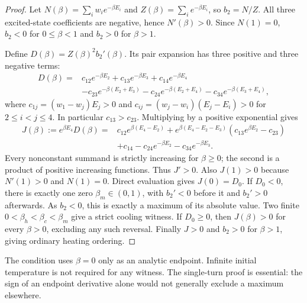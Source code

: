 \begin{proof}
Let $N(\beta)=\sum_iw_i e^{-\beta E_i}$ and $Z(\beta)=\sum_i e^{-\beta E_i}$, so $b_2=N/Z$. All three excited-state coefficients are negative, hence $N'(\beta)>0$. Since $N(1)=0$, $b_2<0$ for $0\leq\beta<1$ and $b_2>0$ for $\beta>1$.

Define $D(\beta)=Z(\beta)^2b_2'(\beta)$. Its pair expansion has three positive and three negative terms:
\begin{align*}
D(\beta)={}&c_{12}e^{-\beta E_2}+c_{13}e^{-\beta E_3}+c_{14}e^{-\beta E_4}\\
&-c_{23}e^{-\beta(E_2+E_3)}-c_{24}e^{-\beta(E_2+E_4)}-c_{34}e^{-\beta(E_3+E_4)},
\end{align*}
where $c_{1j}=(w_1-w_j)E_j>0$ and $c_{ij}=(w_j-w_i)(E_j-E_i)>0$ for $2\leq i<j\leq4$. In particular $c_{13}>c_{23}$. Multiplying by a positive exponential gives
\begin{align*}
J(\beta):=e^{\beta E_4}D(\beta)
={}&c_{12}e^{\beta(E_4-E_2)}
+e^{\beta(E_4-E_2-E_3)}(c_{13}e^{\beta E_2}-c_{23})\\
&+c_{14}-c_{24}e^{-\beta E_2}-c_{34}e^{-\beta E_3}.
\end{align*}
Every nonconstant summand is strictly increasing for $\beta\geq0$; the second is a product of positive increasing functions. Thus $J'>0$. Also $J(1)>0$ because $N'(1)>0$ and $N(1)=0$. Direct evaluation gives $J(0)=D_0$. If $D_0<0$, there is exactly one zero $\beta_m\in(0,1)$, with $b_2'<0$ before it and $b_2'>0$ afterwards. As $b_2<0$, this is exactly a maximum of its absolute value. Two finite $0<\beta_h<\beta_c<\beta_m$ give a strict cooling witness. If $D_0\geq0$, then $J(\beta)>0$ for every $\beta>0$, excluding any such reversal. Finally $J>0$ and $b_2>0$ for $\beta>1$, giving ordinary heating ordering.
\end{proof}
The condition uses $\beta=0$ only as an analytic endpoint. Infinite initial temperature is not required for any witness. The single-turn proof is essential: the sign of an endpoint derivative alone would not generally exclude a maximum elsewhere.

